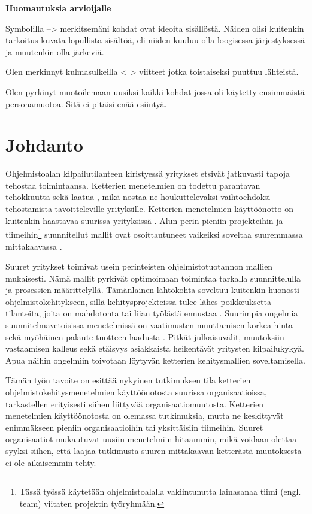 
\textbf{Huomautuksia arvioijalle}

Symbolilla --> merkitsemäni kohdat ovat ideoita sisällöstä. Näiden olisi
kuitenkin tarkoitus kuvata lopullista sisältöä, eli niiden kuuluu olla
loogisessa järjestyksessä ja muutenkin olla järkeviä.

Olen merkinnyt kulmasulkeilla < > viitteet jotka toistaiseksi puuttuu lähteistä.

Olen pyrkinyt muotoilemaan uusiksi kaikki kohdat jossa oli käytetty ensimmäistä
personamuotoa. Sitä ei pitäisi enää esiintyä.

\newpage

\section{Johdanto}

Ohjelmistoalan kilpailutilanteen kiristyessä yritykset etsivät jatkuvasti tapoja
tehostaa toimintaansa. Ketterien menetelmien on todettu parantavan tehokkuutta
sekä laatua , mikä nostaa ne houkuttelevaksi vaihtoehdoksi
tehostamista tavoitteleville yrityksille. Ketterien menetelmien käyttöönotto on
kuitenkin haastavaa suurissa yrityksissä . Alun perin pieniin
projekteihin ja tiimeihin\footnote{Tässä työssä käytetään ohjelmistoalalla
vakiintunutta lainasanaa tiimi (engl. team) viitaten projektin työryhmään.}
suunnitellut mallit ovat osoittautuneet vaikeiksi soveltaa suuremmassa
mittakaavassa .

Suuret yritykset toimivat usein perinteisten ohjelmistotuotannon mallien
mukaisesti. Nämä mallit pyrkivät optimoimaan toimintaa tarkalla suunnittelulla
ja prosessien määrittelyllä. Tämänlainen lähtökohta soveltuu kuitenkin huonosti
ohjelmistokehitykseen, sillä kehitysprojekteissa tulee lähes poikkeuksetta
tilanteita, joita on mahdotonta tai liian työlästä ennustaa .
Suurimpia ongelmia suunnitelmavetoisissa menetelmissä on vaatimusten muuttamisen
korkea hinta sekä myöhäinen palaute tuotteen laadusta .
Pitkät julkaisuvälit, muutoksiin vastaamisen kalleus sekä etäisyys asiakkaista
heikentävät yritysten kilpailukykyä. Apua näihin ongelmiin toivotaan löytyvän
ketterien kehitysmallien soveltamisella.

Tämän työn tavoite on esittää nykyinen tutkimuksen tila ketterien
ohjelmistokehitysmenetelmien käyttöönotosta suurissa organisaatioissa,
tarkastellen erityisesti siihen liittyvää organisaatiomuutosta. Ketterien
menetelmien käyttöönotosta on olemassa tutkimuksia, mutta ne keskittyvät
enimmäkseen pieniin organisaatioihin tai yksittäisiin tiimeihin. Suuret
organisaatiot mukautuvat uusiin menetelmiin hitaammin, mikä voidaan olettaa
syyksi siihen, että laajaa tutkimusta suuren mittakaavan ketterästä muutoksesta
ei ole aikaisemmin tehty.

